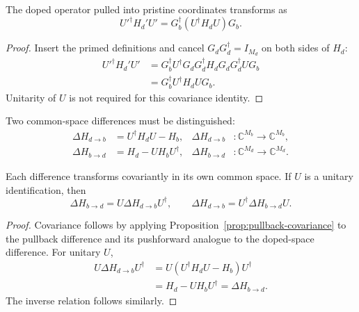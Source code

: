 \begin{proposition}
\label{prop:pullback-covariance}
The doped operator pulled into pristine coordinates transforms as
\begin{equation}
  U'^{\dagger}H_d'U'
  =
  G_b^{\dagger}(U^{\dagger}H_dU)G_b.
\end{equation}
\end{proposition}

\begin{proof}
Insert the primed definitions and cancel
$G_dG_d^{\dagger}=I_{M_d}$ on both sides of $H_d$:
\begin{align}
  U'^{\dagger}H_d'U'
  &=G_b^{\dagger}U^{\dagger}G_d
    G_d^{\dagger}H_dG_d
    G_d^{\dagger}UG_b\\
  &=G_b^{\dagger}U^{\dagger}H_dUG_b.
\end{align}
Unitarity of $U$ is not required for this covariance identity.
\end{proof}

Two common-space differences must be distinguished:
\begin{align}
  \Delta H_{d\to b}
  &=U^{\dagger}H_dU-H_b,
  &\Delta H_{d\to b}&:\mathbb C^{M_b}\to\mathbb C^{M_b},\\
  \Delta H_{b\to d}
  &=H_d-UH_bU^{\dagger},
  &\Delta H_{b\to d}&:\mathbb C^{M_d}\to\mathbb C^{M_d}.
\end{align}

\begin{proposition}
\label{prop:aligned-difference-equivalence}
Each difference transforms covariantly in its own common space. If $U$ is a
unitary identification, then
\begin{equation}
  \Delta H_{b\to d}
  =U\Delta H_{d\to b}U^{\dagger},
  \qquad
  \Delta H_{d\to b}
  =U^{\dagger}\Delta H_{b\to d}U.
\end{equation}
\end{proposition}

\begin{proof}
Covariance follows by applying Proposition~\ref{prop:pullback-covariance} to the
pullback difference and its pushforward analogue to the doped-space difference.
For unitary $U$,
\begin{align}
  U\Delta H_{d\to b}U^{\dagger}
  &=U(U^{\dagger}H_dU-H_b)U^{\dagger}\\
  &=H_d-UH_bU^{\dagger}
  =\Delta H_{b\to d}.
\end{align}
The inverse relation follows similarly.
\end{proof}

